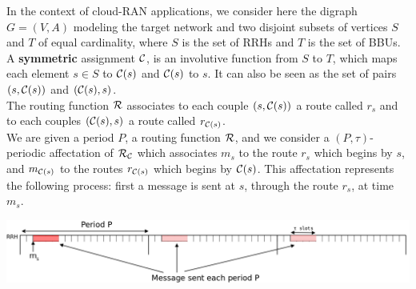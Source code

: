 \documentclass[a4paper,10pt]{article}
\begin{document}
% 

      
      In the context of cloud-RAN applications, we consider here the digraph $G=(V,A)$ modeling the target network 
      and two disjoint subsets of vertices $S$ and $T$ of equal cardinality, where $S$ is the set of RRHs and $T$ is the set of BBUs. 
      A \textbf{symmetric} assignment ${\cal C}$, is an involutive function from $S$ to $T$, which maps each element $s\in S$ to ${\cal C}(s)$ and ${\cal C}(s)$ to $s$. It can also be seen as the set of pairs $(s,{\cal C}(s))$ and $({\cal C}(s),s)$.\\
      The routing function ${\cal R}$ associates to each couple $(s,{\cal C}(s))$ a route called $r_s$ and to each couples $({\cal C}(s),s)$ a route called $r_{{\cal C}(s)}$.\\     
       We are given a period $P$, a routing function ${\cal R}$, and we consider a $(P,\tau)$-periodic affectation of ${\cal R}_{\cal C}$ which associates $m_s$ to the route $r_s$ which begins by $s$, and $m_{{\cal C}(s)}$ to the routes $r_{{\cal C}(s)}$ which begins by ${\cal C}(s)$.  This affectation represents the following process: first a message is sent at $s$, through the route $r_s$, at time $m_s$.
      
%       
      
      
      \begin{center}
      \includegraphics[scale=0.3]{rrh.png}
      \end{center}
      
\end{document}
